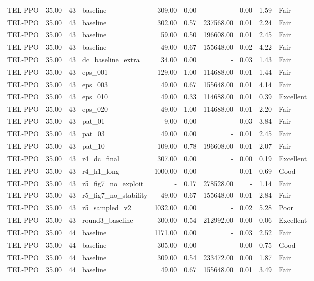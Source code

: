 \begin{table}[htbp]
\begin{tabular}{lrrlrrrrrl}
TEL-PPO & 35.00 & 43 & baseline & 309.00 & 0.00 & - & 0.00 & 1.59 & Fair \\
TEL-PPO & 35.00 & 43 & baseline & 302.00 & 0.57 & 237568.00 & 0.01 & 2.24 & Fair \\
TEL-PPO & 35.00 & 43 & baseline & 59.00 & 0.50 & 196608.00 & 0.01 & 2.45 & Fair \\
TEL-PPO & 35.00 & 43 & baseline & 49.00 & 0.67 & 155648.00 & 0.02 & 4.22 & Fair \\
TEL-PPO & 35.00 & 43 & dc_baseline_extra & 34.00 & 0.00 & - & 0.03 & 1.43 & Fair \\
TEL-PPO & 35.00 & 43 & eps_001 & 129.00 & 1.00 & 114688.00 & 0.01 & 1.44 & Fair \\
TEL-PPO & 35.00 & 43 & eps_003 & 49.00 & 0.67 & 155648.00 & 0.01 & 4.14 & Fair \\
TEL-PPO & 35.00 & 43 & eps_010 & 49.00 & 0.33 & 114688.00 & 0.01 & 0.39 & Excellent \\
TEL-PPO & 35.00 & 43 & eps_020 & 49.00 & 1.00 & 114688.00 & 0.01 & 2.20 & Fair \\
TEL-PPO & 35.00 & 43 & pat_01 & 9.00 & 0.00 & - & 0.03 & 3.84 & Fair \\
TEL-PPO & 35.00 & 43 & pat_03 & 49.00 & 0.00 & - & 0.01 & 2.45 & Fair \\
TEL-PPO & 35.00 & 43 & pat_10 & 109.00 & 0.78 & 196608.00 & 0.01 & 2.07 & Fair \\
TEL-PPO & 35.00 & 43 & r4_dc_final & 307.00 & 0.00 & - & 0.00 & 0.19 & Excellent \\
TEL-PPO & 35.00 & 43 & r4_h1_long & 1000.00 & 0.00 & - & 0.01 & 0.69 & Good \\
TEL-PPO & 35.00 & 43 & r5_fig7_no_exploit & - & 0.17 & 278528.00 & - & 1.14 & Fair \\
TEL-PPO & 35.00 & 43 & r5_fig7_no_stability & 49.00 & 0.67 & 155648.00 & 0.01 & 2.84 & Fair \\
TEL-PPO & 35.00 & 43 & r5_sampled_v2 & 1032.00 & 0.00 & - & 0.02 & 5.28 & Poor \\
TEL-PPO & 35.00 & 43 & round3_baseline & 300.00 & 0.54 & 212992.00 & 0.00 & 0.06 & Excellent \\
TEL-PPO & 35.00 & 44 & baseline & 1171.00 & 0.00 & - & 0.03 & 2.52 & Fair \\
TEL-PPO & 35.00 & 44 & baseline & 305.00 & 0.00 & - & 0.00 & 0.75 & Good \\
TEL-PPO & 35.00 & 44 & baseline & 309.00 & 0.54 & 233472.00 & 0.00 & 1.87 & Fair \\
TEL-PPO & 35.00 & 44 & baseline & 49.00 & 0.67 & 155648.00 & 0.01 & 3.49 & Fair \\

\end{tabular}
\end{table}
